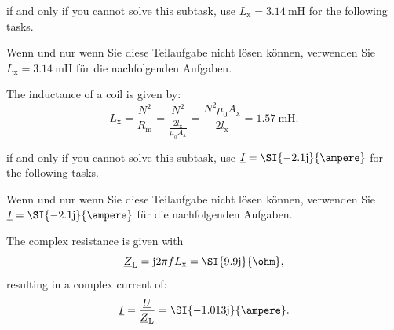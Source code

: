 \begin{hintblock}
	if and only if you cannot solve this subtask, use $L_\mathrm{x} = \SI{3.14}{\milli\henry}$ for the following tasks.
\end{hintblock}


\begin{germanhintblock}
	Wenn und nur wenn Sie diese Teilaufgabe nicht lösen können, verwenden Sie $L_\mathrm{x} = \SI{3.14}{\milli\henry}$ für die nachfolgenden Aufgaben.
\end{germanhintblock}

\begin{solutionblock}
	The inductance of a coil is given by:
	$$
		L_\mathrm{x} = \frac{N^2}{R_{\mathrm{m}}} = \frac{N^2}{\frac{2l_{\mathrm{x}}}{\mu_0 A_{\mathrm{x}}}} = \frac{N^2 \mu_0 A_{\mathrm{x}}}{2 l_{\mathrm{x}}} = \SI{1.57}{\milli\henry}.
	$$
\end{solutionblock}

\begin{hintblock}
	if and only if you cannot solve this subtask, use $\underline{I} = \SI{-2.1 \mathrm{j}}{\ampere}$ for the following tasks.
\end{hintblock}


\begin{germanhintblock}
	Wenn und nur wenn Sie diese Teilaufgabe nicht lösen können, verwenden Sie $\underline{I} = \SI{-2.1 \mathrm{j}}{\ampere}$ für die nachfolgenden Aufgaben.
\end{germanhintblock}

\begin{solutionblock}
	The complex resistance is given with
	$$
		\underline{Z}_\mathrm{L} = \mathrm{j} 2 \pi f L_\mathrm{x} = \SI{9.9\mathrm{j}}{\ohm},
	$$
	resulting in a complex current of:
	$$
		\underline{I} = \frac{\underline{U}}{\underline{Z}_\mathrm{L}} = \SI{-1.013\mathrm{j}}{\ampere}.
	$$
\end{solutionblock}

